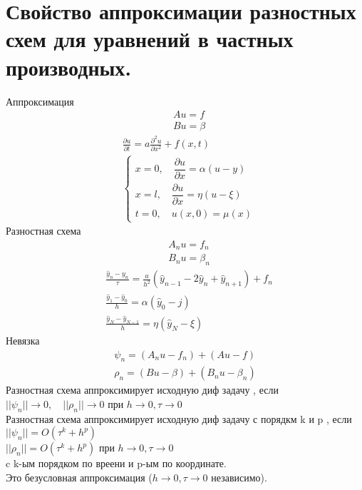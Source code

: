 \documentclass[12pt,a4paper]{article}
\begin{document}
	\section{Свойство аппроксимации разностных схем для уравнений в частных производных.}
	Аппроксимация\\
	\begin{align*}
	&Au = f\\
	&Bu = \beta
	\end{align*}
	\begin{align*}
	&\frac{\partial u}{\partial t} = a \frac{\partial^2 u}{\partial x^2} + f(x,t)\\
	&\begin{cases}
	x = 0, \quad \dfrac{\partial u}{\partial x} = \alpha(u - y)\\
	x = l, \quad \dfrac{\partial u}{\partial x} = \eta(u - \xi)\\
	t = 0, \quad u(x, 0) = \mu(x)
	\end{cases}
	\end{align*}	
	Разностная схема
	\begin{align*}
	&A_n u = f_n\\
	&B_n u = \beta_n
	\end{align*}
	\begin{align*}
	&\frac{\hat{y}_n - y_n}{\tau} = \frac{a}{h^2}(\hat{y}_{n-1} -2\hat{y}_n + \hat{y}_{n+1}) + f_n\\
	&\frac{\hat{y}_1 - \hat{y}_0}{h} = \alpha(\hat{y}_0 - j)\\
	&\frac{\hat{y}_N - \hat{y}_{N-1}}{h} = \eta (\hat{y}_N - \xi)
	\end{align*}
	Невязка
	\begin{align*}
	\psi_n = (A_n u - f_n) + (Au - f)\\
	\rho_n =(Bu - \beta) + (B_n u - \beta_n)
	\end{align*}
	Разностная схема аппроксимирует исходную диф задачу , если \\
	$||\psi_n||\rightarrow0, \quad ||\rho_n || \rightarrow 0$ при $h \rightarrow 0, \tau \rightarrow 0$\\
	Разностная схема аппроксимирует исходную диф задачу с порядкм k и p , если\\
	$||\psi_n|| = O(\tau^k + h^p)$\\
	$||\rho_n || = O(\tau^k + h^p)$ при $h \rightarrow 0, \tau \rightarrow 0$ \\
	c k-ым порядком по вреени и p-ым по координате.\\
	Это безусловная аппроксимация ($h \rightarrow 0, \tau \rightarrow 0$ независимо).\\\\
\end{document}
